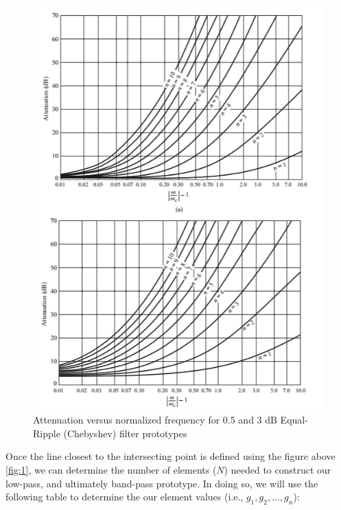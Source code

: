\documentclass{article}
\begin{document}
\begin{figure}[h!]
    \centering
    \includegraphics[scale=1.0]{images/chebyshev_attenuation_table.png}
    \caption{Attenuation versus normalized frequency for 0.5 and 3 dB Equal-Ripple (Chebyshev) filter prototypes}
    \label{fig:4}
\end{figure}
Once the line closest to the intersecting point is defined using the figure above \ref{fig:1}, we can determine the number of elements ($N$) needed to construct our low-pass, and ultimately band-pass prototype. In doing so, we will use the following table to determine the our element values (i.e., $g_1, g_2,...,g_n$):
\end{document}
